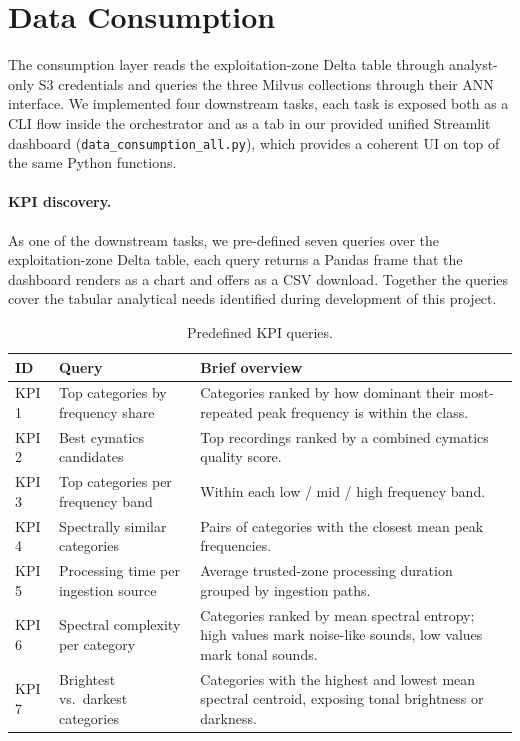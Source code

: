 \documentclass[11pt,a4paper]{article}
\begin{document}

\section{Data Consumption}
The consumption layer reads the exploitation-zone Delta table through analyst-only S3 credentials and queries the three Milvus collections through their ANN interface. We implemented four downstream tasks, each task is exposed both as a CLI flow inside the orchestrator and as a tab in our provided unified Streamlit dashboard (\texttt{data\_consumption\_all.py}), which provides a coherent UI on top of the same Python functions.

\paragraph{KPI discovery.} As one of the downstream tasks, we pre-defined seven queries over the exploitation-zone Delta table, each query returns a Pandas frame that the dashboard renders as a chart and offers as a CSV download. Together the queries cover the tabular analytical needs identified during development of this project.

\begin{table}[H]
\centering
\footnotesize
\renewcommand{\arraystretch}{1.15}
\begin{tabularx}{\textwidth}{@{}p{1.0cm}p{4.7cm}X@{}}
\toprule
\textbf{ID} & \textbf{Query} & \textbf{Brief overview}\\
\midrule
KPI 1 & Top categories by frequency share & Categories ranked by how dominant their most-repeated peak frequency is within the class.\\
KPI 2 & Best cymatics candidates & Top recordings ranked by a combined cymatics quality score.\\
KPI 3 & Top categories per frequency band & Within each low / mid / high frequency band.\\
KPI 4 & Spectrally similar categories & Pairs of categories with the closest mean peak frequencies.\\
KPI 5 & Processing time per ingestion source & Average trusted-zone processing duration grouped by ingestion paths.\\
KPI 6 & Spectral complexity per category & Categories ranked by mean spectral entropy; high values mark noise-like sounds, low values mark tonal sounds.\\
KPI 7 & Brightest vs.\ darkest categories & Categories with the highest and lowest mean spectral centroid, exposing tonal brightness or darkness.\\
\bottomrule
\end{tabularx}
\caption{Predefined KPI queries.}
\label{tab:kpis}
\end{table}
\end{document}
